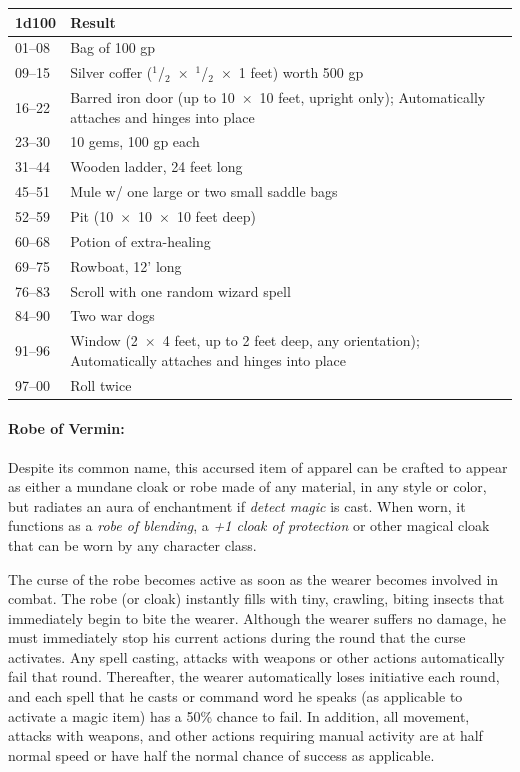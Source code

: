 \begin{multicols}{2}
\noindent
\begin{tabular}{|p{}|p{}|}
\hline
1d100	& Result \\
\hline\hline
\rowcolor[gray]{.9}01--08	& Bag of 100 gp \\
09--15	& Silver coffer ($^1$/$_2$~$\times$~$^1$/$_2$~$\times$~1 feet) worth 500 gp \\
\rowcolor[gray]{.9}16--22	& Barred iron door (up to 10~$\times$~10 feet, upright only); Automatically attaches and hinges into place \\
23--30	& 10 gems, 100 gp each \\
\rowcolor[gray]{.9}31--44	& Wooden ladder, 24 feet long \\
45--51	& Mule w/ one large or two small saddle bags \\
\rowcolor[gray]{.9}52--59	& Pit (10~$\times$~10~$\times$~10 feet deep) \\
60--68	& Potion of extra-healing \\
\rowcolor[gray]{.9}69--75	& Rowboat, 12' long \\
76--83	& Scroll with one random wizard spell \\
\rowcolor[gray]{.9}84--90	& Two war dogs \\
91--96	& Window (2~$\times$~4 feet, up to 2 feet deep, any orientation); Automatically attaches and hinges into place \\
\rowcolor[gray]{.9}97--00	& Roll twice \\
\hline
\end{tabular}

\paragraph{Robe of Vermin:} Despite its common name, this accursed item of apparel can be crafted to appear as either a mundane cloak or robe made of any material, in any style or color, but radiates an aura of enchantment if \textit{detect magic} is cast.  When worn, it functions as a \textit{robe of blending}, a \textit{+1 cloak of protection} or other magical cloak that can be worn by any character class.  

The curse of the robe becomes active as soon as the wearer becomes involved in combat.  The robe (or cloak) instantly fills with tiny, crawling, biting insects that immediately begin to bite the wearer.  Although the wearer suffers no damage, he must immediately stop his current actions during the round that the curse activates.  Any spell casting, attacks with weapons or other actions automatically fail that round.  Thereafter, the wearer automatically loses initiative each round, and each spell that he casts or command word he speaks (as applicable to activate a magic item) has a 50\% chance to fail.  In addition, all movement, attacks with weapons, and other actions requiring manual activity are at half normal speed or have half the normal chance of success as applicable.  


\end{multicols}
